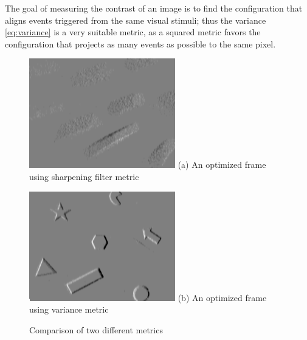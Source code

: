 The goal of measuring the contrast of an image is to find the
configuration that aligns events triggered from the same visual
stimuli; thus the variance \cref{eq:variance} is a very suitable
metric, as a squared metric favors the configuration that projects as
many events as possible to the same pixel.

\begin{figure}
  \begin{minipage}[t]{0.48\textwidth}
    \centering \includegraphics[width =
    \textwidth]{images/high_pass_contrast.png}
    (a) An optimized frame using sharpening filter metric
  \end{minipage}
  \hfill
  \begin{minipage}[t]{0.48\textwidth}
    \centering \includegraphics[width =
    \textwidth]{images/variance_contrast.png}
    (b) An optimized frame using variance metric
  \end{minipage}
  \caption{Comparison of two different metrics}
  \label{fig:contrast}
\end{figure}




